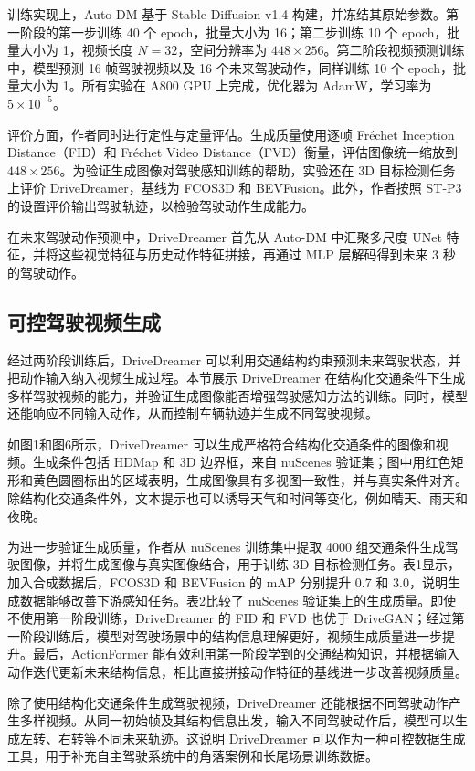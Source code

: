 \documentclass[10pt]{article}
\begin{document}
训练实现上，Auto-DM 基于 Stable Diffusion v1.4 构建，并冻结其原始参数。第一阶段的第一步训练 40 个 epoch，批量大小为 16；第二步训练 10 个 epoch，批量大小为 1，视频长度 $N=32$，空间分辨率为 $448\times256$。第二阶段视频预测训练中，模型预测 16 帧驾驶视频以及 16 个未来驾驶动作，同样训练 10 个 epoch，批量大小为 1。所有实验在 A800 GPU 上完成，优化器为 AdamW，学习率为 $5\times10^{-5}$。

评价方面，作者同时进行定性与定量评估。生成质量使用逐帧 Fréchet Inception Distance（FID）和 Fréchet Video Distance（FVD）衡量，评估图像统一缩放到 $448\times256$。为验证生成图像对驾驶感知训练的帮助，实验还在 3D 目标检测任务上评价 DriveDreamer，基线为 FCOS3D 和 BEVFusion。此外，作者按照 ST-P3 的设置评价输出驾驶轨迹，以检验驾驶动作生成能力。

在未来驾驶动作预测中，DriveDreamer 首先从 Auto-DM 中汇聚多尺度 UNet 特征，并将这些视觉特征与历史动作特征拼接，再通过 MLP 层解码得到未来 3 秒的驾驶动作。

\subsection{可控驾驶视频生成}

经过两阶段训练后，DriveDreamer 可以利用交通结构约束预测未来驾驶状态，并把动作输入纳入视频生成过程。本节展示 DriveDreamer 在结构化交通条件下生成多样驾驶视频的能力，并验证生成图像能否增强驾驶感知方法的训练。同时，模型还能响应不同输入动作，从而控制车辆轨迹并生成不同驾驶视频。

如图1和图6所示，DriveDreamer 可以生成严格符合结构化交通条件的图像和视频。生成条件包括 HDMap 和 3D 边界框，来自 nuScenes 验证集；图中用红色矩形和黄色圆圈标出的区域表明，生成图像具有多视图一致性，并与真实条件对齐。除结构化交通条件外，文本提示也可以诱导天气和时间等变化，例如晴天、雨天和夜晚。

为进一步验证生成质量，作者从 nuScenes 训练集中提取 4000 组交通条件生成驾驶图像，并将生成图像与真实图像结合，用于训练 3D 目标检测任务。表1显示，加入合成数据后，FCOS3D 和 BEVFusion 的 mAP 分别提升 0.7 和 3.0，说明生成数据能够改善下游感知任务。表2比较了 nuScenes 验证集上的生成质量。即使不使用第一阶段训练，DriveDreamer 的 FID 和 FVD 也优于 DriveGAN；经过第一阶段训练后，模型对驾驶场景中的结构信息理解更好，视频生成质量进一步提升。最后，ActionFormer 能有效利用第一阶段学到的交通结构知识，并根据输入动作迭代更新未来结构信息，相比直接拼接动作特征的基线进一步改善视频质量。

除了使用结构化交通条件生成驾驶视频，DriveDreamer 还能根据不同驾驶动作产生多样视频。从同一初始帧及其结构信息出发，输入不同驾驶动作后，模型可以生成左转、右转等不同未来轨迹。这说明 DriveDreamer 可以作为一种可控数据生成工具，用于补充自主驾驶系统中的角落案例和长尾场景训练数据。
\end{document}
